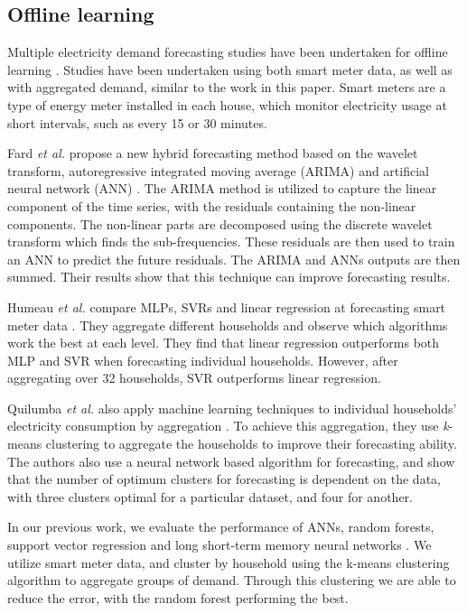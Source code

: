 \documentclass[final,3p,times,twocolumn,numbers]{elsarticle}
\begin{document}
\subsection{Offline learning}

Multiple electricity demand forecasting studies have been undertaken for offline learning \cite{Chen2004, Gross1987, Ghofrani}. Studies have been undertaken using both smart meter data, as well as with aggregated demand, similar to the work in this paper. Smart meters are a type of energy meter installed in each house, which monitor electricity usage at short intervals, such as every 15 or 30 minutes.


Fard \textit{et al.} propose a new hybrid forecasting method based on the wavelet transform, autoregressive integrated moving average (ARIMA) and artificial neural network (ANN) \cite{Fard2014}. The ARIMA method is utilized to capture the linear component of the time series, with the residuals containing the non-linear components. The non-linear parts are decomposed using the discrete wavelet transform which finds the sub-frequencies. These residuals are then used to train an ANN  to predict the future residuals. The ARIMA and ANNs outputs are then summed. Their results show that this technique can improve forecasting results.    

Humeau \textit{et al.} compare MLPs, SVRs and linear regression at forecasting smart meter data \cite{Humeau2013}. They aggregate different households and observe which algorithms work the best at each level. They find that linear regression outperforms both MLP and SVR when forecasting individual households. However, after aggregating over 32 households, SVR outperforms linear regression.


Quilumba \textit{et al.} also apply machine learning techniques to individual households' electricity consumption by aggregation \cite{Fard2014}. To achieve this aggregation, they use \textit{k}-means clustering to aggregate the households to improve their forecasting ability. The authors also use a neural network based algorithm for forecasting, and show that the number of optimum clusters for forecasting is dependent on the data, with three clusters optimal for a particular dataset, and four for another.

In our previous work, we evaluate the performance of ANNs, random forests, support vector regression and long short-term memory neural networks \cite{Kell2018a}. We utilize smart meter data, and cluster by household using the k-means clustering algorithm to aggregate groups of demand. Through this clustering we are able to reduce the error, with the random forest performing the best.
\end{document}
